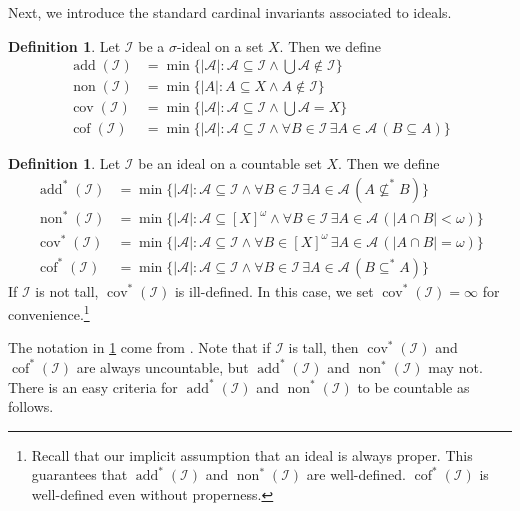 \documentclass[a4paper,12pt]{amsart}
\theoremstyle{definition}
\newtheorem{dfn}[thm]{Definition}
\numberwithin{thm}{section}
\numberwithin{equation}{section}
\DeclareMathOperator{\non}{non}
\DeclareMathOperator{\cov}{cov}
\DeclareMathOperator{\add}{add}
\DeclareMathOperator{\cof}{cof}
\newcommand{\I}{\mathscr{I}}
\renewcommand{\subset}{\subseteq}
\begin{document}
    Next, we introduce the standard cardinal invariants associated to ideals.

    \begin{dfn}
        Let $\mathcal{I}$ be a $\sigma$-ideal on a set $X$. Then we define
        \begin{align*}
            \add(\mathcal{I}) &= \min\{\lvert\mathcal{A}\rvert:\mathcal{A}\subset\mathcal{I}\land\bigcup\mathcal{A}\notin\mathcal{I}\}\\
            \non(\mathcal{I}) &= \min\{\lvert A\rvert: A\subset X\land A\notin \mathcal{I}\}\\
            \cov(\mathcal{I}) &= \min\{\lvert\mathcal{A}\rvert:\mathcal{A}\subset\mathcal{I}\land\bigcup\mathcal{A} = X\}\\
            \cof(\mathcal{I}) &= \min\{\lvert\mathcal{A}\rvert:\mathcal{A}\subset\mathcal{I}\land\forall B\in\mathcal{I}\,\exists A\in\mathcal{A}\,(B\subset A)\}
        \end{align*}
    \end{dfn}

    \begin{dfn}\label{dfn:star_numbers}
        Let $\I$ be an ideal on a countable set $X$. Then we define
        \begin{align*}
            \add^*(\I) &= \min\{\lvert\mathcal{A}\rvert: \mathcal{A}\subset\I\land\forall B\in\I\,\exists A\in\mathcal{A}\,(A \not\subset^* B)\}\\
            \non^*(\I) &= \min\{\lvert\mathcal{A}\rvert: \mathcal{A}\subset[X]^\omega\land\forall B\in\I\,\exists A\in\mathcal{A}\,(\lvert A\cap B \rvert<\omega)\}\\
            \cov^*(\I) &= \min\{\lvert\mathcal{A}\rvert: \mathcal{A}\subset\I\land\forall B\in [X]^{\omega}\,\exists A\in\mathcal{A}\,(\lvert A\cap B\rvert = \omega)\}\\
            \cof^*(\I) &= \min\{\lvert\mathcal{A}\rvert: \mathcal{A}\subset\I\land\forall B\in\I\,\exists A\in\mathcal{A}\,(B \subset^* A)\}
        \end{align*}
        If $\I$ is not tall, $\cov^*(\I)$ is ill-defined. In this case, we set $\cov^*(\I) = \infty$ for convenience.\footnote{Recall that our implicit assumption that an ideal is always proper. This guarantees that $\add^*(\I)$ and $\non^*(\I)$ are well-defined. $\cof^*(\I)$ is well-defined even without properness.}
    \end{dfn}

    The notation in \cref{dfn:star_numbers} come from \cite{HH07}.
    Note that if $\I$ is tall, then $\cov^*(\I)$ and $\cof^*(\I)$ are always uncountable, but $\add^*(\I)$ and $\non^*(\I)$ may not. There is an easy criteria for $\add^*(\I)$ and $\non^*(\I)$ to be countable as follows.
\end{document}
